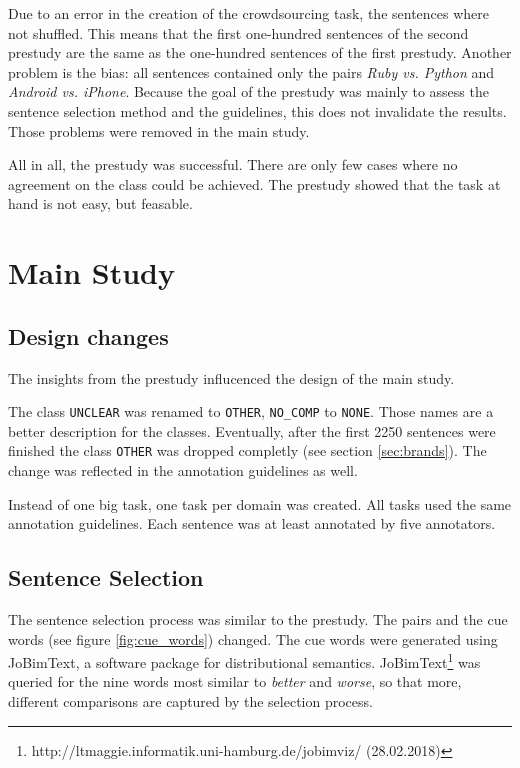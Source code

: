 Due to an error in the creation of the crowdsourcing task, the sentences where not shuffled. This means that the first one-hundred sentences of the second prestudy are the same as the one-hundred sentences of the first prestudy. Another problem is the bias: all sentences contained only the pairs \emph{Ruby vs. Python} and \emph{Android vs. iPhone}. Because the goal of the prestudy was mainly to assess the sentence selection method and the guidelines, this does not invalidate the results. Those problems were removed in the main study.
\hfill\newline

All in all, the prestudy was successful. There are only few cases where no agreement on the class could be achieved. The prestudy showed that the task at hand is not easy, but feasable.

\newpage
\section{Main Study}
\label{sec:mainstudy}
\subsection{Design changes}
\label{sec:designchanges}
The insights from the prestudy influcenced the design of the main study.

The class \texttt{UNCLEAR} was renamed to \texttt{OTHER}, \texttt{NO\_COMP} to \texttt{NONE}. Those names are a better description for the classes. Eventually, after the first 2250 sentences were finished the class \texttt{OTHER} was dropped completly (see section \ref{sec:brands}). The change was reflected in the annotation guidelines as well. 

Instead of one big task, one task per domain was created. All tasks used the same annotation guidelines. Each sentence was at least annotated by five annotators.


\subsection{Sentence Selection}
The sentence selection process was similar to the prestudy. The pairs and the cue words (see figure \ref{fig:cue_words}) changed. The cue words were generated using JoBimText, a software package for distributional semantics. JoBimText\footnote{http://ltmaggie.informatik.uni-hamburg.de/jobimviz/ (28.02.2018)} was queried for the nine words most similar to \emph{better} and \emph{worse}, so that more, different comparisons are captured by the selection process.

